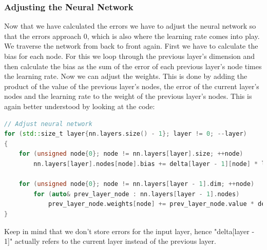 \subsubsection{Adjusting the Neural Network}
Now that we have calculated the errors we have to adjust the neural network so that the errors approach 0, which is also where the learning rate comes into play. We traverse the network from back to front again. First we have to calculate the bias for each node. For this we loop through the previous layer's dimension and then calculate the bias as the sum of the error of each previous layer's node times the learning rate. Now we can adjust the weights. This is done by adding the product of the value of the previous layer's nodes, the error of the current layer's nodes and the learning rate to the weight of the previous layer's nodes. This is again better understood by looking at the code: 

\begin{lstlisting}[language=C++]
// Adjust neural network
for (std::size_t layer{nn.layers.size() - 1}; layer != 0; --layer)
{
	for (unsigned node{0}; node != nn.layers[layer].size; ++node)
		nn.layers[layer].nodes[node].bias += delta[layer - 1][node] * learning_rate;

	for (unsigned node{0}; node != nn.layers[layer - 1].dim; ++node)
		for (auto& prev_layer_node : nn.layers[layer - 1].nodes)
			prev_layer_node.weights[node] += prev_layer_node.value * delta[layer - 1][node] * learning_rate;
}
\end{lstlisting}

Keep in mind that we don't store errors for the input layer, hence "delta[layer - 1]" actually refers to the current layer instead of the previous layer.


\filbreak
